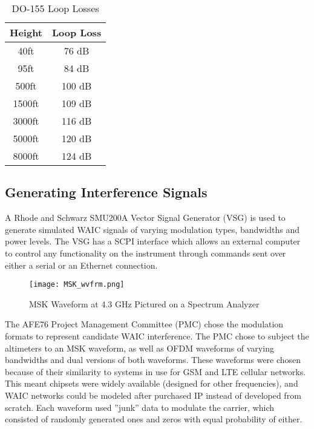 \begin{table}[]
\centering
\begin{tabular}{|c|c|}
\hline
\textbf{Height} & \textbf{Loop Loss} \\ \hline
40ft            & 76 dB              \\ \hline
95ft            & 84 dB              \\ \hline
500ft           & 100 dB             \\ \hline
1500ft          & 109 dB             \\ \hline
3000ft          & 116 dB             \\ \hline
5000ft          & 120 dB             \\ \hline
8000ft          & 124 dB             \\ \hline
\end{tabular}
\caption{DO-155 Loop Losses}
\label{tab:loop loss}
\end{table}

\subsection{Generating Interference Signals}\label{sub:Generating}
A Rhode and Schwarz SMU200A Vector Signal Generator (VSG) is used to generate simulated WAIC signals of varying modulation types, bandwidths and power levels. The VSG has a SCPI interface which allows an external computer to control any functionality on the instrument through commands sent over either a serial or an Ethernet connection. 
\begin{figure}[ht]
\centering
\texttt{[image: MSK\_wvfrm.png]}
\caption{MSK Waveform at 4.3 GHz Pictured on a Spectrum Analyzer}

\label{fig:MSK}

\end{figure}

The AFE76 Project Management Committee (PMC) chose the modulation formats to represent candidate WAIC interference. The PMC chose to subject the altimeters to an MSK waveform, as well as OFDM waveforms of varying bandwidths and dual versions of both waveforms. These waveforms were chosen because of their similarity to systems in use for GSM and LTE cellular networks. This meant chipsets were widely available (designed for other frequencies), and WAIC networks could be modeled after purchased IP instead of developed from scratch. Each waveform used ''junk'' data to modulate the carrier, which consisted of randomly generated ones and zeros with equal probability of either.
